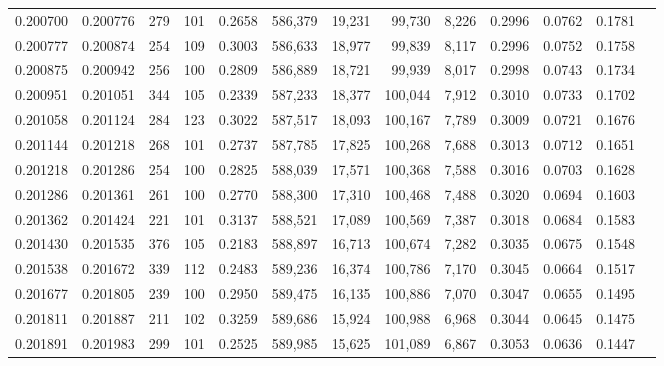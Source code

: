 \begin{tabular}{rrrrrrrrrrrrr}
0.200700 & 0.200776 &   279 & 101 &                                     0.2658 & 586,379 &  19,231 &  99,730 &   8,226 & 0.2996 & 0.0762 & 0.1781 \\
0.200777 & 0.200874 &   254 & 109 &                                     0.3003 & 586,633 &  18,977 &  99,839 &   8,117 & 0.2996 & 0.0752 & 0.1758 \\
0.200875 & 0.200942 &   256 & 100 &                                     0.2809 & 586,889 &  18,721 &  99,939 &   8,017 & 0.2998 & 0.0743 & 0.1734 \\
0.200951 & 0.201051 &   344 & 105 &                                     0.2339 & 587,233 &  18,377 & 100,044 &   7,912 & 0.3010 & 0.0733 & 0.1702 \\
0.201058 & 0.201124 &   284 & 123 &                                     0.3022 & 587,517 &  18,093 & 100,167 &   7,789 & 0.3009 & 0.0721 & 0.1676 \\
0.201144 & 0.201218 &   268 & 101 &                                     0.2737 & 587,785 &  17,825 & 100,268 &   7,688 & 0.3013 & 0.0712 & 0.1651 \\
0.201218 & 0.201286 &   254 & 100 &                                     0.2825 & 588,039 &  17,571 & 100,368 &   7,588 & 0.3016 & 0.0703 & 0.1628 \\
0.201286 & 0.201361 &   261 & 100 &                                     0.2770 & 588,300 &  17,310 & 100,468 &   7,488 & 0.3020 & 0.0694 & 0.1603 \\
0.201362 & 0.201424 &   221 & 101 &                                     0.3137 & 588,521 &  17,089 & 100,569 &   7,387 & 0.3018 & 0.0684 & 0.1583 \\
0.201430 & 0.201535 &   376 & 105 &                                     0.2183 & 588,897 &  16,713 & 100,674 &   7,282 & 0.3035 & 0.0675 & 0.1548 \\
0.201538 & 0.201672 &   339 & 112 &                                     0.2483 & 589,236 &  16,374 & 100,786 &   7,170 & 0.3045 & 0.0664 & 0.1517 \\
0.201677 & 0.201805 &   239 & 100 &                                     0.2950 & 589,475 &  16,135 & 100,886 &   7,070 & 0.3047 & 0.0655 & 0.1495 \\
0.201811 & 0.201887 &   211 & 102 &                                     0.3259 & 589,686 &  15,924 & 100,988 &   6,968 & 0.3044 & 0.0645 & 0.1475 \\
0.201891 & 0.201983 &   299 & 101 &                                     0.2525 & 589,985 &  15,625 & 101,089 &   6,867 & 0.3053 & 0.0636 & 0.1447 \\

\end{tabular}
